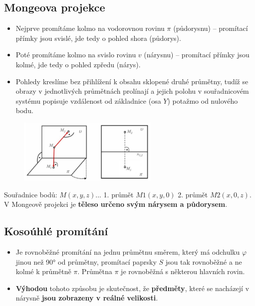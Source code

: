 \subsection{Mongeova projekce}
\begin{itemize}
	\item Nejprve promítáme kolmo na vodorovnou rovinu $\pi$ (půdorysnu) -- promítací přímky jsou svislé, jde tedy o pohled shora (půdorys).
	\item Poté promítáme kolmo na svislo rovinu $v$ (nárysnu) -- promítací přímky jsou kolmé, jde tedy o pohled zpředu (nárys).
	\item Pohledy kreslíme bez přihlížení k obsahu sklopené druhé průmětny, tudíž se obrazy v jednotlivých průmětnách prolínají a jejich polohu v souřadnicovém systému popisuje vzdálenost od základnice (osa $Y$) potažmo od nulového bodu.
\end{itemize}
\begin{figure}[H]
\centering
\includegraphics[width=0.6\textwidth]{assets/2_mongeova}
\end{figure}

Souřadnice bodů: $M(x, y, z)$... 1. průmět $M1 (x, y, 0)$ 2. průmět $M2 (x, 0, z)$. V Mongeově projekci je\textbf{ těleso určeno svým nárysem a půdorysem}.
\subsection{Kosoúhlé promítání}
\begin{itemize}
	\item Je rovnoběžné promítání na jednu průmětnu směrem, který má odchulku $\varphi$ jinou než \ang{90} od průmětny, promítací paprsky $S$ jsou tak rovnoběžné a ne kolmé k průmětně $\pi$. Průmětna $\pi$ je rovnoběžná s některou hlavních rovin.
	\item \textbf{Výhodou} tohoto způsobu je skutečnost, že \textbf{předměty}, které se nacházejí v nárysně \textbf{jsou zobrazeny v reálné velikosti}.
\end{itemize}
